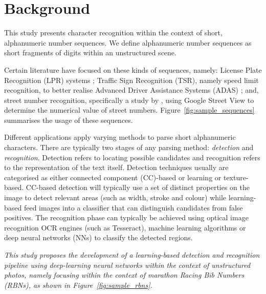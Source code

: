 \section{Background}

This study presents character recognition within the context of short, alphanumeric number sequences. We define alphanumeric number sequences as short fragments of digits within an unstructured scene.   

Certain literature have focused on these kinds of sequences, namely: License Plate Recognition (LPR) systems \citep{CanoPerez:2003fq,Anagnostopoulos:2006wv}; Traffic Sign Recognition (TSR), namely speed limit recognition, to better realise Advanced Driver Assistance Systems (ADAS) \citep{Eichner:2008dw,Kundu:2015vq,Seo:2015ez,Lian:2016dc}; and, street number recognition, specifically a study by \citet{Netzer:2011to}, using Google Street View to determine the numerical value of street numbers. Figure~\ref{fig:sample_sequences} summarises the usage of these sequences.

Different applications apply varying methods to parse short alphanumeric characters. There are typically two stages of any parsing method: \textit{detection} and \textit{recognition}. Detection refers to locating possible candidates and recognition refers to the representation of the text itself. Detection techniques usually are categorised as either connected component (CC)-based or learning or texture-based. CC-based detection will typically use a set of distinct properties on the image to detect relevant areas (such as width, stroke and colour) while learning-based feed images into a classifier that can distinguish candidates from false positives. The recognition phase can typically be achieved using optical image recognition OCR engines (such as Tesseract), machine learning algorithms or deep neural networks (NNs) to classify the detected regions.

{
  \itshape
  This study proposes the development of a learning-based detection and recognition pipeline using deep-learning neural networks within the context of unstructured photos, namely focusing within the context of marathon Racing Bib Numbers (RBNs), as shown in Figure~\ref{fig:sample_rbns}.
}


